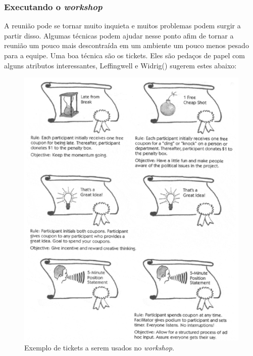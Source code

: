      \subsubsection{Executando o \textit{workshop}}
      
	A reunião pode se tornar muito inquieta e muitos problemas podem surgir a partir disso. 
	Algumas técnicas podem ajudar nesse ponto afim de tornar a reunião um pouco mais descontraída 
	em um ambiente um pouco menos pesado para a equipe. 
	Uma boa técnica são os tickets. Eles são pedaços de papel com alguns atributos interessantes, 
	Leffingwell e Widrig(\citeyear{leffingwell99}) sugerem estes abaixo:
	
	\begin{figure}[!htbp]
	  \centering
	  \includegraphics[scale=0.25]{editaveis/figuras/tickets}
	  \caption[Exemplo de tickets a serem usados no \textit{workshop}]
	    {Exemplo de tickets a serem usados no \textit{workshop}.\footnotemark}
	  \label{tickets}
	\end{figure}
	
